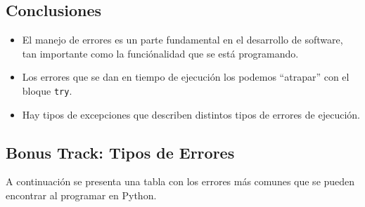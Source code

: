 \documentclass[
  letterpaper,
  DIV=11,
  numbers=noendperiod]{scrreprt}
\providecommand{\tightlist}{%
  \setlength{\itemsep}{0pt}\setlength{\parskip}{0pt}}\usepackage{longtable,booktabs,array}
\begin{document}
\subsection{Conclusiones}\label{conclusiones-1}

\begin{itemize}
\tightlist
\item
  El manejo de errores es un parte fundamental en el desarrollo de
  software, tan importante como la funciónalidad que se está
  programando.
\item
  Los errores que se dan en tiempo de ejecución los podemos ``atrapar''
  con el bloque \texttt{try}.
\item
  Hay tipos de excepciones que describen distintos tipos de errores de
  ejecución.
\end{itemize}

\subsection{Bonus Track: Tipos de
Errores}\label{bonus-track-tipos-de-errores}

A continuación se presenta una tabla con los errores más comunes que se
pueden encontrar al programar en Python.
\end{document}
